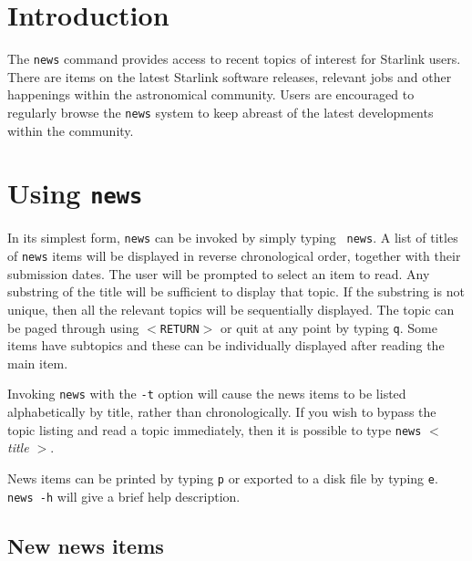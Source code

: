 \newpage
 \begin{latexonly}
   \setlength{\parskip}{0mm}
   \latexonlytoc
   \setlength{\parskip}{\medskipamount}
   \markright{\stardocname}
 \end{latexonly}
\newpage
\renewcommand{\thepage}{\arabic{page}}
\setcounter{page}{1}

\section{Introduction}

The {\tt news} command provides access to recent topics of interest for
Starlink users.  There are items on the latest Starlink software
releases, relevant jobs and other happenings within the astronomical
community.  Users are encouraged to regularly browse the {\tt news}
system to keep abreast of the latest developments within the
community.

\section{Using {\tt news}}

In its simplest form, {\tt news} can be invoked by simply typing {\tt
news}.  A list of titles of {\tt news} items will be displayed in
reverse chronological order, together with their submission dates.  The
user will be prompted to select an item to read.  Any substring of the
title will be sufficient to display that topic.  If the substring is not
unique, then all the relevant topics will be sequentially displayed.
The topic can be paged through using {\tt $<$RETURN$>$} or quit  at any
point by typing {\tt q}.  Some items have subtopics and these can be
individually displayed after reading the main item.

Invoking {\tt news} with the {\tt -t} option will cause the news items
to be listed alphabetically by title, rather than chronologically.  If
you wish to bypass the topic listing and read a topic immediately,
then it is possible to type {\tt news} {\it $<$ title $>$}.

News items can be printed by typing {\tt p} or exported to a disk 
file by typing {\tt e}. {\tt news -h} will give a brief help description.

\subsection{New news items}

